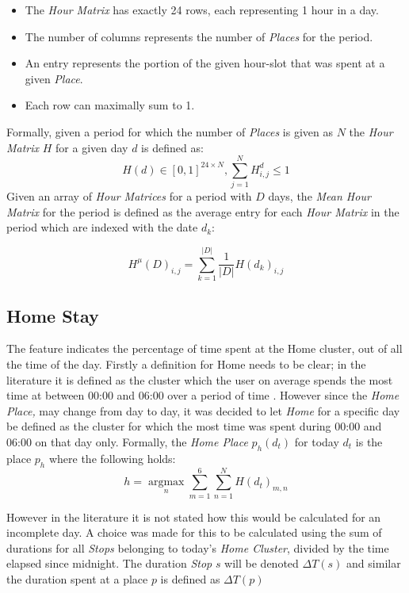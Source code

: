 \begin{itemize}
    \item The \textit{Hour Matrix} has exactly 24 rows, each representing 1 hour in a day.
    \item The number of columns represents the number of \textit{Places} for the period. 
    \item An entry represents the portion of the given hour-slot that was spent at a given \textit{Place}.
    \item Each row can maximally sum to 1.
\end{itemize}

Formally, given a period for which the number of \textit{Places} is given as $N$ the \textit{Hour Matrix} $H$ for a given day $d$ is defined as:
$$H(d) \in [0,1]^{24 \times N}, \sum_{j=1}^N H^d_{i,j} \leq 1$$
Given an array of \textit{Hour Matrices} for a period with $D$ days, the \textit{Mean Hour Matrix} for the period is defined as the average entry for each \textit{Hour Matrix} in the period which are indexed with the date $d_k$:

$$H^{\mu} (D) _{i,j} = \sum_{k=1}^{|D|} \frac{1}{|D|} H(d_k)_{i,j}$$

\subsection{Home Stay}
The  feature indicates the percentage of time spent at the Home cluster, out of all the time of the day. Firstly a definition for Home needs to be clear; in the literature it is defined as the cluster which the user on average spends the most time at between 00:00 and 06:00 over a period of time \cite{Saeb2015, Canzian2015}. However since the \textit{Home Place,} may change from day to day, it was decided to let \textit{Home} for a specific day be defined as the cluster for which the most time was spent during 00:00 and 06:00 on that day only. Formally, the \textit{Home Place} $p_h (d_t)$ for today $d_t$ is the place $p_h$ where the following holds:
$$h = \operatorname*{argmax}_n \sum_{m=1}^{6} \sum_{n=1}^{N} H(d_t)_{m,n}$$

However in the literature \cite{Saeb2015, Canzian2015} it is not stated how this would be calculated for an incomplete day. A choice was made for this to be calculated using the sum of durations for all \textit{Stops} belonging to today's \textit{Home Cluster}, divided by the time elapsed since midnight. The duration \textit{Stop} $s$ will be denoted $\Delta T (s)$ and similar the duration spent at a place $p$ is defined as $\Delta T (p)$

